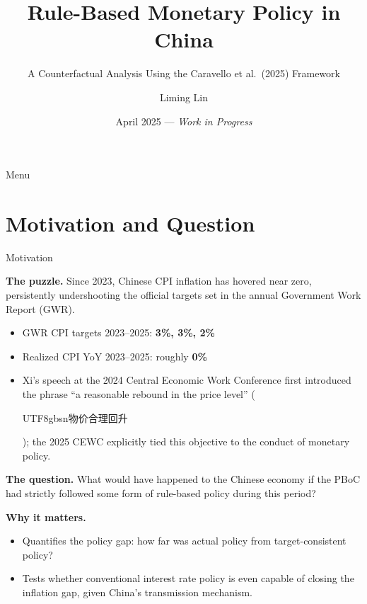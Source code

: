 \documentclass[10pt,aspectratio=169,t]{beamer}
\title{Rule-Based Monetary Policy in China}
\subtitle{A Counterfactual Analysis Using the Caravello et al.\ (2025) Framework}
\author{Liming Lin}
\institute{Sciences Po Paris \\ \small Supervisor: Paul Bouscasse\\
\small Jury: Paul Bouscasse, Axelle Ferrière}
\date{April 2025 — \textit{Work in Progress}}
\begin{document}
\maketitle

\begin{frame}{Menu}
\setcounter{tocdepth}{2}
\tableofcontents
\end{frame}

\section{Motivation and Question}

\begin{frame}{Motivation}

\textbf{The puzzle.} Since 2023, Chinese CPI inflation has hovered near zero,
persistently undershooting the official targets set in the annual Government
Work Report (GWR).


\begin{itemize}
  \item GWR CPI targets 2023--2025: \textbf{3\%, 3\%, 2\%}
  \item Realized CPI YoY 2023--2025: roughly \textbf{0\%}
  \item Xi's speech at the 2024 Central Economic Work Conference first
        introduced the phrase ``a reasonable rebound in the price level''
        (\begin{CJK}{UTF8}{gbsn}物价合理回升\end{CJK}); the 2025 CEWC
        explicitly tied this objective to the conduct of monetary policy.
\end{itemize}

\textbf{The question.} What would have happened to the Chinese economy if
the PBoC had strictly followed some form of rule-based policy during this
period?

\textbf{Why it matters.}
\begin{itemize}
  \item Quantifies the policy gap: how far was actual policy from
        target-consistent policy?
  \item Tests whether conventional interest rate policy is even capable
        of closing the inflation gap, given China's transmission mechanism.
\end{itemize}

\end{frame}
\end{document}
